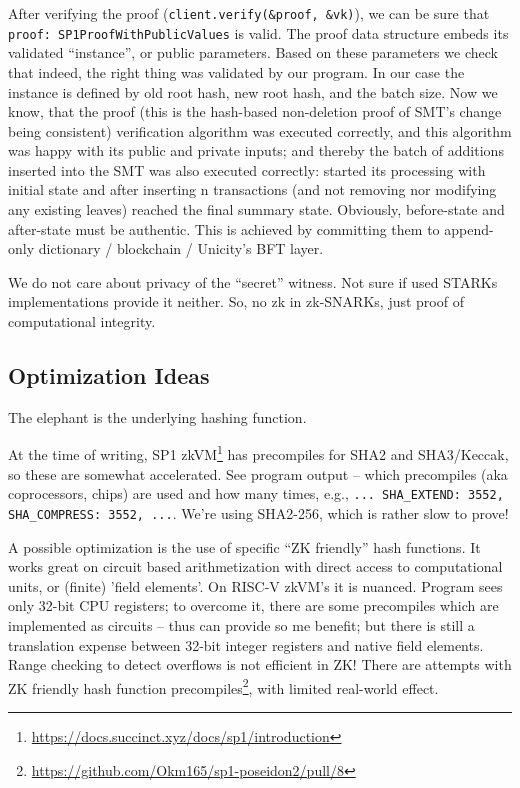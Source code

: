 \documentclass{llncs}
\begin{document}
\begin{sloppypar}
After verifying the proof (\lstinline|client.verify(&proof, &vk)|), we can be sure that \lstinline|proof: SP1ProofWithPublicValues| is valid. The proof data structure embeds its validated ``instance'', or public parameters. Based on these parameters we check that indeed, the right thing was validated by our program. In our case the instance is defined by old root hash, new root hash, and the batch size. Now we know, that the proof (this is the hash-based non-deletion proof of SMT's change being consistent) verification algorithm was executed correctly, and this algorithm was happy with its public and private inputs; and thereby the batch of additions inserted into the SMT was also executed correctly: started its processing with initial state and after inserting n transactions (and not removing nor modifying any existing leaves) reached the final summary state. Obviously, before-state and after-state must be authentic. This is achieved by committing them to append-only dictionary / blockchain / Unicity's BFT layer.
\end{sloppypar}

We do not care about privacy of the ``secret'' witness. Not sure if used STARKs implementations provide it neither. So, no zk in zk-SNARKs, just proof of computational integrity.


\subsection{Optimization Ideas}

The elephant is the underlying hashing function.

At the time of writing, SP1 zkVM\footnote{\url{https://docs.succinct.xyz/docs/sp1/introduction}} has precompiles for SHA2 and SHA3/Keccak, so these are somewhat accelerated. See program output -- which precompiles (aka coprocessors, chips) are used and how many times, e.g., \lstinline|... SHA_EXTEND: 3552, SHA_COMPRESS: 3552, ...|. We're using SHA2-256, which is rather slow to prove!

A possible optimization is the use of specific ``ZK friendly'' hash functions. It works great on circuit based arithmetization with direct access to computational units, or (finite) 'field elements'. On RISC-V zkVM's it is nuanced. Program sees only 32-bit CPU registers; to overcome it, there are some precompiles which are implemented as circuits -- thus can provide so me benefit; but there is still a translation expense between 32-bit integer registers and native field elements. Range checking to detect overflows is not efficient in ZK! There are attempts with ZK friendly hash function precompiles\footnote{\url{https://github.com/Okm165/sp1-poseidon2/pull/8}}, with limited real-world effect.
\end{document}
